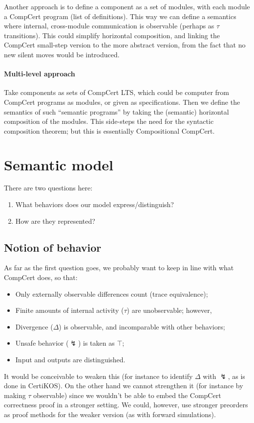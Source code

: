 \documentclass[11pt]{article}
\begin{document}
Another approach is to define a component as a set of modules,
with each module a CompCert program (list of definitions).
This way we can define a semantics where
internal, cross-module communication is observable
(perhaps as $\tau$ transitions).
This could simplify horizontal composition,
and linking the CompCert small-step version
to the more abstract version,
from the fact that no new silent moves
would be introduced.


\paragraph{Multi-level approach} %

Take components as sets of CompCert LTS,
which could be computer from CompCert programs as modules,
or given as specifications.
Then we define the semantics of such
``semantic programs'' by taking the (semantic)
horizontal composition of the modules.
This side-steps the need for the syntactic composition theorem;
but this is essentially Compositional CompCert.



\section{Semantic model} %

There are two questions here:
\begin{enumerate}
\item What behaviors does our model express/distinguish?
\item How are they represented?
\end{enumerate}

\subsection{Notion of behavior} %

As far as the first question goes,
we probably want to keep in line with what CompCert does,
so that:
\begin{itemize}
\item Only externally observable differences count (trace equivalence);
\item Finite amounts of internal activity ($\tau$) are unobservable;
  however,
\item Divergence ($\Delta$) is observable,
  and incomparable with other behaviors;
\item Unsafe behavior ($\lightning$) is taken as $\top$;
\item Input and outputs are distinguished.
\end{itemize}
It would be conceivable to weaken this
(for instance to identify $\Delta$ with $\lightning$,
as is done in CertiKOS).
On the other hand we cannot strengthen it
(for instance by making $\tau$ observable)
since we wouldn't be able to embed
the CompCert correctness proof in a stronger setting.
We could, however,
use stronger preorders as proof methods
for the weaker version
(as with forward simulations).
\end{document}
